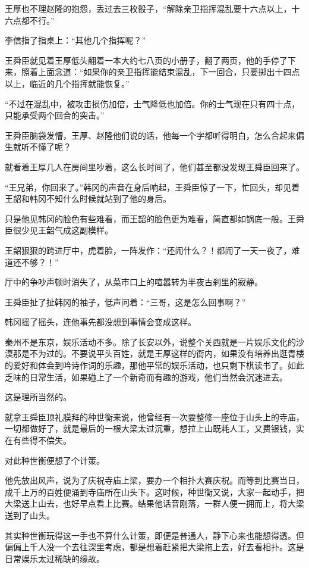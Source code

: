 王厚也不理赵隆的抱怨，丢过去三枚骰子，“解除亲卫指挥混乱要十六点以上，十六点都不行。”

李信指了指桌上：“其他几个指挥呢？”

王舜臣就见着王厚低头翻着一本大约七八页的小册子，翻了两页，他的手停了下来，照着上面念道：“如果你的亲卫指挥能结束混乱，下一回合，只要掷出十四点以上，临近的几个指挥就能恢复。”

“不过在混乱中，被攻击损伤加倍，士气降低也加倍。你的士气现在只有四十点，只能承受两个回合的突击。”

王舜臣脑袋发懵，王厚、赵隆他们说的话，他每一个字都听得明白，怎么合起来偏生就听不懂了呢？

就看着王厚几人在房间里吵着，这么长时间了，他们甚至都没发现王舜臣回来了。

“王兄弟，你回来了。”韩冈的声音在身后响起，王舜臣惊了一下，忙回头，却见着王韶和韩冈不知什么时候就站到了他的身后。

只是他见韩冈的脸色有些难看，而王韶的脸色更为难看，简直都如锅底一般。王舜臣很少见王韶气成这副模样。

王韶狠狠的跨进厅中，虎着脸，一阵发作：“还闹什么？！都闹了一天一夜了，难道还不够？！”

厅中的争吵声顿时消失了，从菜市口上的喧嚣转为半夜古刹里的寂静。

王舜臣扯了扯韩冈的袖子，低声问着：“三哥，这是怎么回事啊？”

韩冈摇了摇头，连他事先都没想到事情会变成这样。

秦州不是东京，娱乐活动不多。除了长安以外，说整个关西就是一片娱乐文化的沙漠那是不为过的。不要说平头百姓，就是王厚这样的衙内，如果没有培养出逛青楼的爱好和体会到吟诗作词的乐趣，那他平常的娱乐活动，也只剩下棋读书了。如此乏味的日常生活，如果碰上了一个新奇而有趣的游戏，他们当然会沉迷进去。

这是理所当然的。

就拿王舜臣顶礼膜拜的种世衡来说，他曾经有一次要整修一座位于山头上的寺庙，一切都做好了，就是最后的一根大梁太过沉重，想拉上山既耗人工，又费银钱，实在有些得不偿失。

对此种世衡便想了个计策。

他先放出风声，说为了庆祝寺庙上梁，要办一个相扑大赛庆祝。而等到比赛当日，成千上万的百姓便涌到寺庙所在山头下。这时候，种世衡又说，大家一起动手，把大梁送上山去，也好早点看上比赛。结果他话音刚落，一群人便一拥而上，将大梁送到了山头。

其实种世衡玩得这一手也不算什么计策，即便是普通人，静下心来也能想得透。但偏偏上千人没一个去往深里考虑，都是想着赶紧把大梁拖上去，好去看相扑。这是日常娱乐太过稀缺的缘故。


